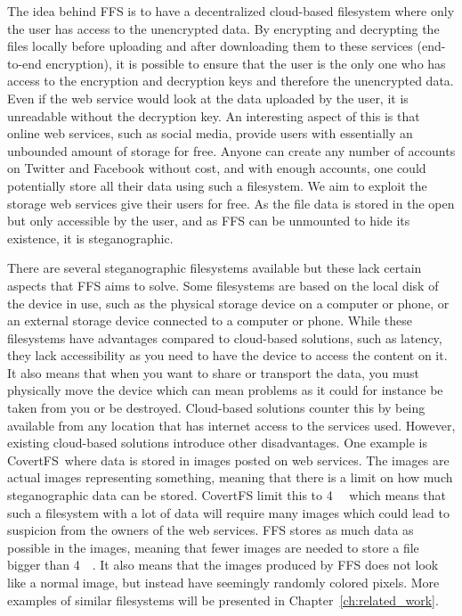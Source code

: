 The idea behind \gls{FFS} is to have a decentralized \mbox{cloud-based} filesystem where only the user has access to the unencrypted data. By encrypting and decrypting the files locally before uploading and after downloading them to these services (\mbox{end-to-end} encryption), it is possible to ensure that the user is the only one who has access to the encryption and decryption keys and therefore the unencrypted data. Even if the web service would look at the data uploaded by the user, it is unreadable without the decryption key. An interesting aspect of this is that online web services, such as social media, provide users with essentially an unbounded amount of storage for free. Anyone can create any number of accounts on Twitter and Facebook without cost, and with enough accounts, one could potentially store all their data using such a filesystem. We aim to exploit the storage web services give their users for free. As the file data is stored in the open but only accessible by the user, and as \gls{FFS} can be unmounted to hide its existence, it is steganographic. 

There are several steganographic filesystems available but these lack certain aspects that \gls{FFS} aims to solve. Some filesystems are based on the local disk of the device in use, such as the physical storage device on a computer or phone, or an external storage device connected to a computer or phone. While these filesystems have advantages compared to \mbox{cloud-based} solutions, such as latency, they lack accessibility as you need to have the device to access the content on it. It also means that when you want to share or transport the data, you must physically move the device which can mean problems as it could for instance be taken from you or be destroyed. \mbox{Cloud-based} solutions counter this by being available from any location that has internet access to the services used. However, existing \mbox{cloud-based} solutions introduce other disadvantages. One example is CovertFS\,\cite{baliga2007web} where data is stored in images posted on web services. The images are actual images representing something, meaning that there is a limit on how much steganographic data can be stored. CovertFS limit this to \SI{4}{\kilo\byte} which means that such a filesystem with a lot of data will require many images which could lead to suspicion from the owners of the web services. \gls{FFS} stores as much data as possible in the images, meaning that fewer images are needed to store a file bigger than \SI{4}{\kilo\byte}. It also means that the images produced by \gls{FFS} does not look like a normal image, but instead have seemingly randomly colored pixels. More examples of similar filesystems will be presented in Chapter~\ref{ch:related_work}. 